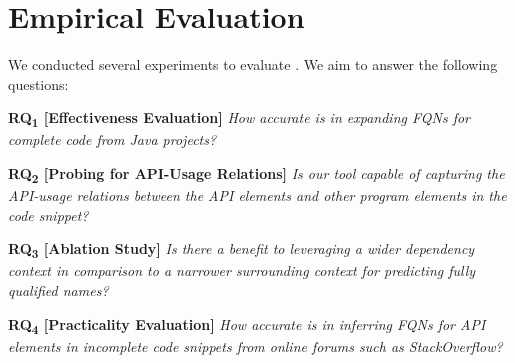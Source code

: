 \section{Empirical Evaluation}
\label{sec:eval}


We conducted several experiments to evaluate {\tool}. We aim to answer the following questions:

\vspace{2pt}
\noindent \textbf{RQ\textsubscript{1} 
  [Effectiveness Evaluation]} {\em How accurate is {\tool} in expanding FQNs for complete code from Java projects?}

\vspace{2pt}
\noindent \textbf{RQ\textsubscript{2} [Probing for API-Usage Relations]} {\em Is our tool capable of capturing the API-usage relations between the API elements and other program elements in the code snippet?}

\vspace{2pt}
\noindent \textbf{RQ\textsubscript{3} 
[Ablation Study]}  {\em Is there a benefit to leveraging a wider dependency context in comparison to a narrower surrounding context for predicting fully qualified names?}

\vspace{2pt}
\noindent \textbf{RQ\textsubscript{4} 
[Practicality Evaluation]}  {\em How accurate is {\tool} in 
inferring FQNs for API elements in incomplete code snippets from online forums such as StackOverflow?}

%
